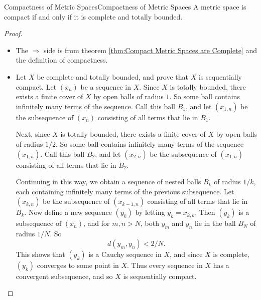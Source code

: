 \documentclass[../main.tex]{subfiles}
\begin{document}
\begin{theorem}{Compactness of Metric Spaces}{Compactness of Metric Spaces}
	A metric space is compact if and only if it is complete and totally bounded.
\end{theorem}
\begin{proof}
\begin{itemize}
	\item The $\Rightarrow$ side is from theorem \ref{thm:Compact Metric Spaces are Complete} and the definition of compactness.
	\item Let $X$ be complete and totally bounded, and prove that $X$ is sequentially compact. Let $(x_n)$ be a sequence in $X$. Since $X$ is totally bounded, there exists a finite cover of $X$ by open balls of radius $1$. So some ball contains infinitely many terms of the sequence. Call this ball $B_1$, and let $(x_{1,n})$ be the subsequence of $(x_n)$ consisting of all terms that lie in $B_1$.

		Next, since $X$ is totally bounded, there exists a finite cover of $X$ by open balls of radius $1/2$. So some ball contains infinitely many terms of the sequence $(x_{1,n})$. Call this ball $B_2$, and let $(x_{2,n})$ be the subsequence of $(x_{1,n})$ consisting of all terms that lie in $B_2$.

		Continuing in this way, we obtain a sequence of nested balls $B_k$ of radius $1/k$, each containing infinitely many terms of the previous subsequence. Let $(x_{k,n})$ be the subsequence of $(x_{k-1,n})$ consisting of all terms that lie in $B_k$. Now define a new sequence $(y_k)$ by letting $y_k = x_{k,k}$. Then $(y_k)$ is a subsequence of $(x_n)$, and for $m,n > N$, both $y_m$ and $y_n$ lie in the ball $B_N$ of radius $1/N$. So
		\begin{equation*}
			d(y_m,y_n) < 2/N.
		\end{equation*}
		This shows that $(y_k)$ is a Cauchy sequence in $X$, and since $X$ is complete, $(y_k)$ converges to some point in $X$. Thus every sequence in $X$ has a convergent subsequence, and so $X$ is sequentially compact.
\end{itemize}
\end{proof}
\end{document}
